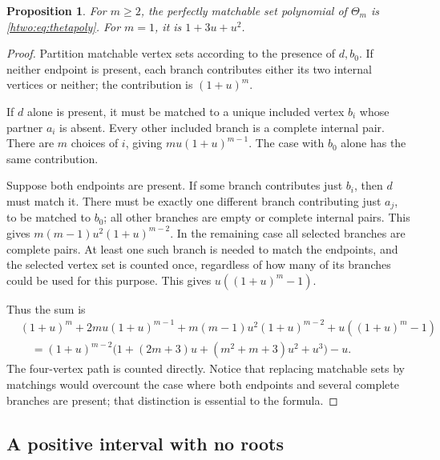 \documentclass[11pt]{article}
\numberwithin{equation}{section}
\newtheorem{proposition}[theorem]{Proposition}
\theoremstyle{definition}
\begin{document}
\begin{proposition}\label{htwo:prop:thetaformula}
For $m\ge2$, the perfectly matchable set polynomial of $\Theta_m$ is
\eqref{htwo:eq:thetapoly}. For $m=1$, it is $1+3u+u^2$.
\end{proposition}
\begin{proof}
Partition matchable vertex sets according to the presence of $d,b_0$.
If neither endpoint is present, each branch contributes either its two
internal vertices or neither; the contribution is $(1+u)^m$.

If $d$ alone is present, it must be matched to a unique included vertex
$b_i$ whose partner $a_i$ is absent. Every other included branch is a
complete internal pair. There are $m$ choices of $i$, giving
$mu(1+u)^{m-1}$. The case with $b_0$ alone has the same contribution.

Suppose both endpoints are present. If some branch contributes just $b_i$,
then $d$ must match it. There must be exactly one different branch
contributing just $a_j$, to be matched to $b_0$; all other branches are
empty or complete internal pairs. This gives
$m(m-1)u^2(1+u)^{m-2}$. In the remaining case all selected branches are
complete pairs. At least one such branch is needed to match the endpoints,
and the selected vertex set is counted once, regardless of how many of its
branches could be used for this purpose. This gives
$u((1+u)^m-1)$.

Thus the sum is
\begin{align*}
 &(1+u)^m+2mu(1+u)^{m-1}
     +m(m-1)u^2(1+u)^{m-2}+u((1+u)^m-1)\\
 &\hspace{1em}=(1+u)^{m-2}
       \bigl(1+(2m+3)u+(m^2+m+3)u^2+u^3\bigr)-u.
\end{align*}
The four-vertex path is counted directly. Notice that replacing matchable
sets by matchings would overcount the case where both endpoints and several
complete branches are present; that distinction is essential to the formula.
\end{proof}

\subsection{A positive interval with no roots}
\end{document}

